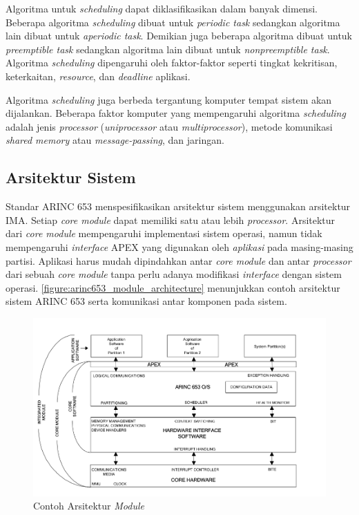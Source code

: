 Algoritma untuk \textit{scheduling} dapat diklasifikasikan dalam banyak dimensi.
Beberapa algoritma \textit{scheduling} dibuat untuk \textit{periodic task} sedangkan algoritma lain dibuat untuk \textit{aperiodic task}.
Demikian juga beberapa algoritma dibuat untuk \textit{preemptible task} sedangkan algoritma lain dibuat untuk \textit{nonpreemptible task}.
Algoritma \textit{scheduling} dipengaruhi oleh faktor-faktor seperti tingkat kekritisan, keterkaitan, \textit{resource}, dan \textit{deadline} aplikasi.

Algoritma \textit{scheduling} juga berbeda tergantung komputer tempat sistem akan dijalankan.
Beberapa faktor komputer yang mempengaruhi algoritma \textit{scheduling} adalah jenis \textit{processor} (\textit{uniprocessor} atau \textit{multiprocessor}), metode komunikasi \textit{shared memory} atau \textit{message-passing}, dan jaringan.

\subsection{Arsitektur Sistem}

Standar ARINC 653 menspesifikasikan arsitektur sistem menggunakan arsitektur IMA.
Setiap \textit{core module} dapat memiliki satu atau lebih \textit{processor}. Arsitektur dari \textit{core module} mempengaruhi implementasi sistem operasi, namun tidak mempengaruhi \textit{interface} APEX yang digunakan oleh \textit{aplikasi} pada masing-masing partisi.
Aplikasi harus mudah dipindahkan antar \textit{core module} dan antar \textit{processor} dari sebuah \textit{core module} tanpa perlu adanya modifikasi \textit{interface} dengan sistem operasi.
\autoref{figure:arinc653_module_architecture} menunjukkan contoh arsitektur sistem ARINC 653 serta komunikasi antar komponen pada sistem.

\begin{figure}[htbp]
    \centering
    \includegraphics[scale=0.4]{resources/arinc653-architecture.png}
    \caption{Contoh Arsitektur \textit{Module} \citep{AirlinesElectronicEngineeringCommittee2012}}
    \label{figure:arinc653_module_architecture}
\end{figure}

